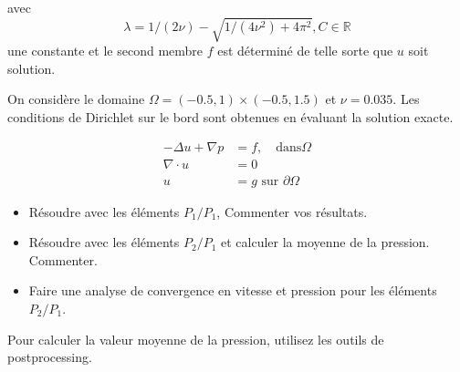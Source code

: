 \documentclass[11pt,utf8]{article}
\begin{document}
avec $$\lambda=1 /(2 \nu)-\sqrt{1 /\left(4 \nu^{2}\right)+4 \pi^{2}}, C \in \mathbb{R}$$ une constante et le second membre $f$ est déterminé de telle sorte que $u$ soit solution.

On considère le domaine $\Omega=(-0.5,1) \times(-0.5,1.5)$ et $\nu=0.035 .$ Les conditions de Dirichlet sur le bord sont obtenues en évaluant la solution exacte.


 $$ \begin{aligned} -\Delta u+\nabla p&=f, \quad \text{dans} \Omega\\ \nabla \cdot u &=0 \\ u &=g \text{ sur } \partial \Omega \end{aligned}$$

  \begin{itemize}
    \item Résoudre avec les éléments $P_{1} / P_{1}$, Commenter vos résultats.

    \item Résoudre avec les éléments $P_{2} / P_{1}$ et calculer la moyenne de la pression. Commenter.
  
    \item Faire une analyse de convergence en vitesse et pression pour les éléments $P_{2} / P_{1}$.
  
  \end{itemize}
  
Pour calculer la valeur moyenne de la pression, utilisez les outils de postprocessing.
\end{document}

